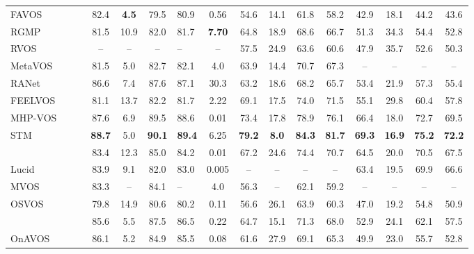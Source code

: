 \documentclass{article}
\begin{document}
\begin{table*}
{\begin{tabular}[t]{lcc cccHc cccc cccc}
        \cmidrule(r){1-16} \cmidrule(lr){4-8} \cmidrule(lr){9-12} \cmidrule(lr){13-16}
FAVOS~\cite{Cheng_favos_2018}        & & & 82.4 & \textbf{4.5}  & 79.5 & 80.9 & 0.56 & 54.6 & 14.1  & 61.8 & 58.2 & 42.9 & 18.1 & 44.2 & 43.6 \\
RGMP~\cite{oh2018fast}                  & & & 81.5 & 10.9  & 82.0 & 81.7 & \textbf{7.70} & 64.8 & 18.9 & 68.6 & 66.7 & 51.3 & 34.3 & 54.4 & 52.8 \\
        RVOS~\cite{oh2018fast}                  & & & -- & --  & -- & -- & -- & 57.5 & 24.9 & 63.6 & 60.6 & 47.9 & 35.7 & 52.6 & 50.3\\
        MetaVOS~\cite{meta_words}               & & & 81.5 & 5.0  & 82.7 & 82.1 & 4.0 & 63.9 & 14.4 & 70.7 & 67.3  &--&--&--&--\\
        RANet~\cite{Ziqin2019RANet}             & & & 86.6 & 7.4 & 87.6 & 87.1 & 30.3 & 63.2 & 18.6 & 68.2 & 65.7 & 53.4 & 21.9 & 57.3 & 55.4\\
        FEELVOS~\cite{voigtlaender2019feelvos}  & & & 81.1 & 13.7  & 82.2 & 81.7 & 2.22 & 69.1 & 17.5 & 74.0 & 71.5  & 55.1 & 29.8 & 60.4 & 57.8\\
        MHP-VOS~\cite{xu2019mhp}                & & & 87.6 & 6.9  & 89.5 & 88.6 & 0.01 & 73.4  & 17.8 & 78.9 & 76.1  & 66.4 & 18.0 & 72.7 & 69.5\\
        STM~\cite{STM_19}                       & & & \textbf{88.7} & 5.0  & \textbf{90.1} & \textbf{89.4} & 6.25 & \textbf{79.2} & \textbf{8.0} & \textbf{84.3} & \textbf{81.7} & \textbf{69.3} & \textbf{16.9} & \textbf{75.2} & \textbf{72.2}\\
\cmidrule(r){1-16}
~\cite{cinm}                               & & & 83.4 & 12.3  & 85.0 & 84.2 & 0.01 & 67.2 & 24.6 & 74.4 & 70.7 & 64.5 & 20.0 & 70.5 & 67.5\\
        Lucid~\cite{lucid}                                                  & & &83.9 & 9.1  & 82.0 & 83.0 & 0.005 & -- & --  & -- & -- & 63.4 & 19.5 & 69.9 & 66.6\\
        MVOS~\cite{MVOS}                                                & & & 83.3 & --  & 84.1 & -- & 4.0 & 56.3 & --  & 62.1 & 59.2  &--&--&--&--\\
        OSVOS~\cite{OSVOS}                                                & & & 79.8 & 14.9  & 80.6 & 80.2 & 0.11 & 56.6 & 26.1  & 63.9 & 60.3 & 47.0 & 19.2 & 54.8 & 50.9\\
        ~\cite{OSVOS-S}                       & & & 85.6 & 5.5  & 87.5 & 86.5 & 0.22 & 64.7 & 15.1  & 71.3 & 68.0 & 52.9 & 24.1  & 62.1 & 57.5\\
        OnAVOS~\cite{onavos}                                                & & & 86.1 & 5.2  & 84.9 & 85.5 & 0.08 & 61.6 & 27.9  & 69.1 & 65.3 & 49.9 & 23.0 & 55.7 & 52.8\\


\end{tabular}}
\end{table*}
\end{document}
